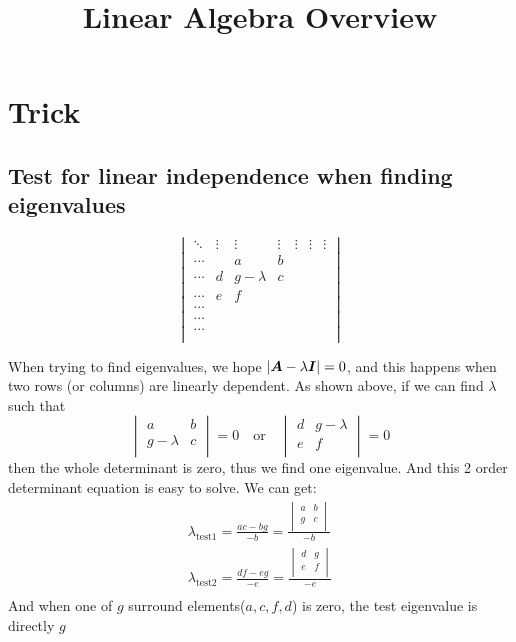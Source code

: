 \documentclass{overview}
\title{Linear Algebra Overview}
\begin{document}
\maketitle

\section{Trick}

\subsection{Test for linear independence when finding eigenvalues}

\[
\begin{vmatrix}
\ddots & \vdots & \vdots     & \vdots & \vdots & \vdots & \vdots \\
\cdots &        & a          & b      &        &       &        \\
\cdots & d      & g -\lambda & c      &        &        &        \\
\cdots & e      & f          &        &        &        &        \\
\cdots &        &            &        &        &        &        \\
\cdots &        &            &        &        &        &        \\
\cdots &        &            &        &        &        &        \\
\end{vmatrix}
\] 

When trying to find eigenvalues, we hope $|\boldsymbol{A}-\lambda\boldsymbol{I}|=0$, and this happens
when two rows (or columns) are linearly dependent. As shown above, if we can find
$\lambda$ such that  \[
\begin{vmatrix}
	a & b \\
	g-\lambda & c \\
\end{vmatrix}=0\quad \text{or}\quad
\begin{vmatrix}
 d & g-\lambda \\
 e & f \\
\end{vmatrix}=0
\] 
then the whole determinant is zero, thus we find one eigenvalue. And this 2 order
determinant equation is easy to solve. We can get:
\[
	\begin{aligned}
	\lambda_{\text{test1}} = \frac{ac-bg}{-b} = \frac{
		\begin{vmatrix}
			a & b \\
			g & c \\
		\end{vmatrix}
	}{-b} \\
	\lambda_{\text{test2}} = \frac{df-eg}{-e} = \frac{
		\begin{vmatrix}
			d & g \\
			e & f \\
		\end{vmatrix}
	}{-e} \\
	\end{aligned}
\] 
And when one of $g$ surround elements($a,c,f,d$) is zero, the test eigenvalue is
directly  $g$
\end{document}
